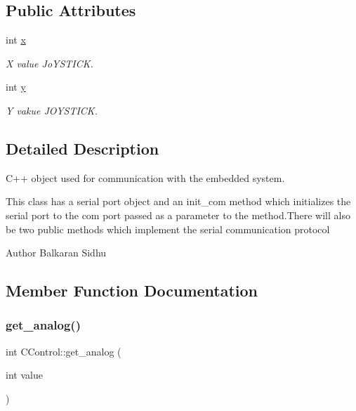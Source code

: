 \subsection*{Public Attributes}
\begin{DoxyCompactItemize}
\item 
\hypertarget{class_c_control_ace18c1c2a9b70a663bad4ede2556a788}{}\label{class_c_control_ace18c1c2a9b70a663bad4ede2556a788} 
int \hyperlink{class_c_control_ace18c1c2a9b70a663bad4ede2556a788}{x}
\begin{DoxyCompactList}\small\item\em X value Jo\+Y\+S\+T\+I\+CK. \end{DoxyCompactList}\item 
\hypertarget{class_c_control_a143a30a147cb0e1487ff52a7ca1a937e}{}\label{class_c_control_a143a30a147cb0e1487ff52a7ca1a937e} 
int \hyperlink{class_c_control_a143a30a147cb0e1487ff52a7ca1a937e}{y}
\begin{DoxyCompactList}\small\item\em Y vakue J\+O\+Y\+S\+T\+I\+CK. \end{DoxyCompactList}\end{DoxyCompactItemize}


\subsection{Detailed Description}
C++ object used for communication with the embedded system. 

This class has a serial port object and an init\+\_\+com method which initializes the serial port to the com port passed as a parameter to the method.\+There will also be two public methods which implement the serial communication protocol

\begin{DoxyAuthor}{Author}
Balkaran Sidhu 
\end{DoxyAuthor}


\subsection{Member Function Documentation}
\hypertarget{class_c_control_acf0620145af8af25d74656b0e66e8658}{}\label{class_c_control_acf0620145af8af25d74656b0e66e8658} 
\subsubsection{\texorpdfstring{get\+\_\+analog()}{get\_analog()}}
{\footnotesize\ttfamily int C\+Control\+::get\+\_\+analog (\begin{DoxyParamCaption}\item[{int}]{value }\end{DoxyParamCaption})}



